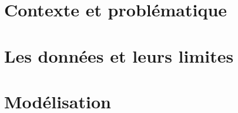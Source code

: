 \documentclass[12pt,a4paper]{report}
\begin{document}





\part{Contexte et problématique}
\label{part:contexte}

\part{Les données et leurs limites}
\label{part:donnees}

\part{Modélisation}
\label{part:modele}
\end{document}
